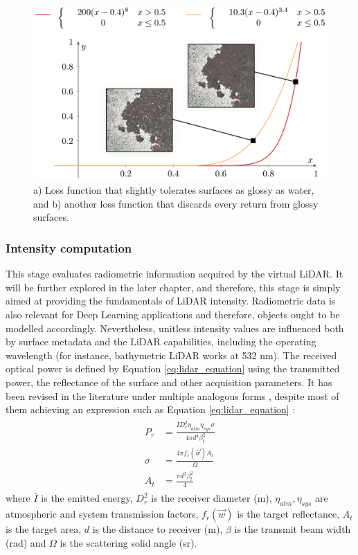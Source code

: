 \begin{figure}
	\centering
	\includegraphics[width=.85\linewidth]{figs/lidar_simulation/glossy_loss.png}
	\caption{a) Loss function that slightly tolerates surfaces as glossy as water, and b) another loss function that discards every return from glossy surfaces. }
	\label{fig:glossy_loss}
\end{figure}

\subsubsection{Intensity computation}

This stage evaluates radiometric information acquired by the virtual LiDAR. It will be further explored in the later chapter, and therefore, this stage is simply aimed at providing the fundamentals of LiDAR intensity. Radiometric data is also relevant for Deep Learning applications and therefore, objects ought to be modelled accordingly. Nevertheless, unitless intensity values are influenced both by surface metadata and the LiDAR capabilities, including the operating wavelength (for instance, bathymetric LiDAR works at 532 \si{\nano\meter}). The received optical power is defined by Equation \ref{eq:lidar_equation} using the transmitted power, the reflectance of the surface and other acquisition parameters. It has been revised in the literature under multiple analogous forms \cite{hofle_correction_2007, bolkas_effect_2018, dong_lidar_2018}, despite most of them achieving an expression such as Equation \ref{eq:lidar_equation} \cite{kashani_review_2015}:
\begin{gather}
    \label{eq:lidar_equation}
    \begin{aligned}
        P_{r} &= \frac{\bar{I} D^{2}_{r} \eta_{atm} \eta_{sys} \sigma}{4 \pi d^{4} \beta^{2}_{t}}\\
        \sigma &= \frac{4\pi f_{r}(\vec{w})A_{t}}{\Omega}\\
        A_{t} &= \frac{\pi d^{2} \beta^{2}_{t}}{4}
    \end{aligned}
\end{gather}
where $\bar{I}$ is the emitted energy, $D^{2}_{r}$ is the receiver diameter (\si{\meter}), $\eta_{atm}, \eta_{sys}$ are atmospheric and system transmission factors, $f_{r}(\vec{w})$ is the target reflectance, $A_{t}$ is the target area, $d$ is the distance to receiver (\si{\meter}), $\beta$ is the transmit beam width (\si{\radian}) and $\Omega$ is the scattering solid angle (\si{\steradian}).

